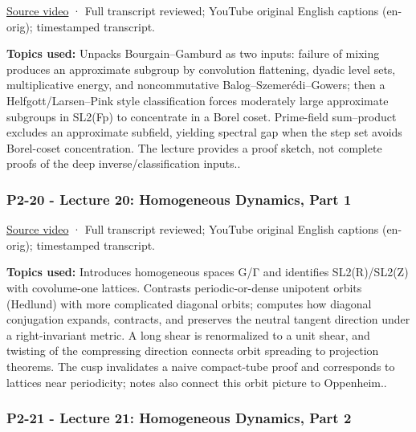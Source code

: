 \hypertarget{04-visual-computing-ii-ch036-p2-19---lecture-19-random-walks-on-finite-groups-part-3}{}

\href{https://www.youtube.com/watch?v=bBzcaYNAfcI}{Source video} · Full transcript reviewed; YouTube original English captions (en-orig); timestamped transcript.

\textbf{Topics used:} Unpacks Bourgain--Gamburd as two inputs: failure of mixing produces an approximate subgroup by convolution flattening, dyadic level sets, multiplicative energy, and noncommutative Balog--Szemerédi--Gowers; then a Helfgott/Larsen--Pink style classification forces moderately large approximate subgroups in SL2(Fp) to concentrate in a Borel coset. Prime-field sum--product excludes an approximate subfield, yielding spectral gap when the step set avoids Borel-coset concentration. The lecture provides a proof sketch, not complete proofs of the deep inverse/classification inputs..

\subsubsection{P2-20 - Lecture 20: Homogeneous Dynamics, Part 1}\label{04-visual-computing-ii-ch036-p2-20---lecture-20-homogeneous-dynamics-part-1}

\hypertarget{04-visual-computing-ii-ch036-p2-20---lecture-20-homogeneous-dynamics-part-1}{}

\href{https://www.youtube.com/watch?v=rChKr66KG-c}{Source video} · Full transcript reviewed; YouTube original English captions (en-orig); timestamped transcript.

\textbf{Topics used:} Introduces homogeneous spaces G/Γ and identifies SL2(R)/SL2(Z) with covolume-one lattices. Contrasts periodic-or-dense unipotent orbits (Hedlund) with more complicated diagonal orbits; computes how diagonal conjugation expands, contracts, and preserves the neutral tangent direction under a right-invariant metric. A long shear is renormalized to a unit shear, and twisting of the compressing direction connects orbit spreading to projection theorems. The cusp invalidates a naive compact-tube proof and corresponds to lattices near periodicity; notes also connect this orbit picture to Oppenheim..

\subsubsection{P2-21 - Lecture 21: Homogeneous Dynamics, Part 2}\label{04-visual-computing-ii-ch036-p2-21---lecture-21-homogeneous-dynamics-part-2}

